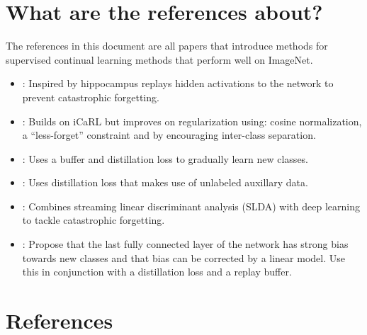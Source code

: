 \documentclass{article}
\author{by Henry Bourne}
\date{\today}
\newcommand{\setfoldernameastitle}{%
  \begingroup
  \edef\x{\endgroup\noexpand\title{\currfilebase}}\x
}
\begin{document}
\setfoldernameastitle %

\maketitle

\section{What are the references about?}
The references in this document are all papers that introduce methods for supervised continual learning methods that perform well on ImageNet. 

\begin{itemize}
  \item \cite{hayes2020remind}: Inspired by hippocampus replays hidden activations to the network to prevent catastrophic forgetting.
  \item \cite{hou2019learning}: Builds on iCaRL \cite{rebuffi2017icarl} but improves on regularization using: cosine normalization, a ``less-forget'' constraint and by encouraging inter-class separation.
  \item \cite{castro2018end}: Uses a buffer and distillation loss to gradually learn new classes.
  \item \cite{zhang2020class}: Uses distillation loss that makes use of unlabeled auxillary data.
  \item \cite{hayes2020lifelong}: Combines streaming linear discriminant analysis (SLDA) with deep learning to tackle catastrophic forgetting.
  \item \cite{wu2019large}: Propose that the last fully connected layer of the network has strong bias towards new classes and that bias can be corrected by a linear model. Use this in conjunction with a distillation loss and a replay buffer.
\end{itemize}

\section{References}
\end{document}
